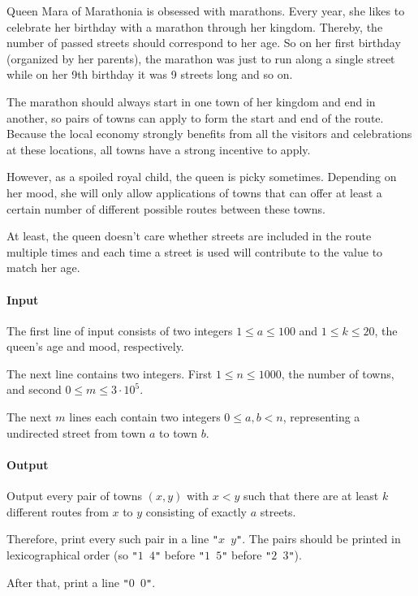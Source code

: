 




Queen Mara of Marathonia is obsessed with marathons. Every year, she likes to celebrate her birthday with a marathon through her kingdom. Thereby, the number of passed streets should correspond to her age. So on her first birthday (organized by her parents), the marathon was just to run along a single street while on her 9th birthday it was 9 streets long and so on.

The marathon should always start in one town of her kingdom and end in another, so pairs of towns can apply to form the start and end of the route. Because the local economy strongly benefits from all the visitors and celebrations at these locations, all towns have a strong incentive to apply.

However, as a spoiled royal child, the queen is picky sometimes. Depending on her mood, she will only allow applications of towns that can offer at least a certain number of different possible routes between these towns.

At least, the queen doesn't care whether streets are included in the route multiple times and each time a street is used will contribute to the value to match her age.

\paragraph*{Input}
The first line of input consists of two integers \(1\le a \le 100\) and \(1\le k \le 20\), the queen's age and mood, respectively.

The next line contains two integers. First \(1 \le n \le 1000\), the number of towns, and second \(0\le m \le 3\cdot 10^5\). 

The next \(m\) lines each contain two integers \(0 \le a,b < n\), representing a undirected street from town \(a\) to town \(b\). 

\paragraph*{Output}
Output every pair of towns \((x,y)\) with \(x < y\) such that there are at least \(k\) different routes from \(x\) to \(y\) consisting of exactly \(a\) streets.

Therefore, print every such pair in a line \texttt{"\(x\) \(y\)"}. The pairs should be printed in lexicographical order (so \texttt{"\(1\) \(4\)"} before \texttt{"\(1\) \(5\)"} before \texttt{"\(2\) \(3\)"}).

After that, print a line \texttt{"\(0\) \(0\)"}.


